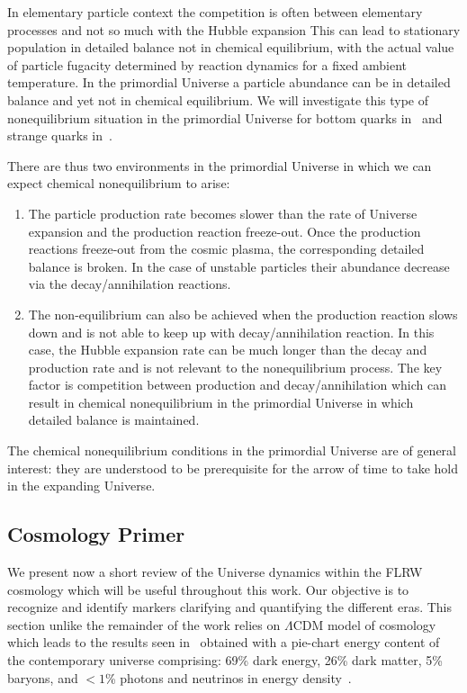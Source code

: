 In elementary particle context the competition is often between elementary processes and not so much with the Hubble expansion This can lead to stationary population in detailed balance not in chemical equilibrium, with  the actual value of particle fugacity determined by reaction dynamics for a fixed ambient temperature. In the primordial Universe a particle abundance can be in detailed balance and yet not in chemical equilibrium. We will investigate this type of nonequilibrium situation in the primordial Universe for bottom quarks in~ and strange quarks in~.

There are thus two environments in the primordial Universe in which we can expect chemical nonequilibrium to arise:
\begin{enumerate}
\item The particle production rate becomes slower than the rate of Universe expansion and the production reaction freeze-out. Once the production reactions freeze-out from the cosmic plasma, the corresponding detailed balance is broken. In the case of unstable particles their abundance decrease via the decay/annihilation reactions.
%
\item The non-equilibrium can also be achieved when the production reaction slows down and is not able to keep up with decay/annihilation reaction. In this case, the Hubble expansion rate can be much longer than the decay and production rate and is not relevant to the nonequilibrium process. The key factor is competition between production and decay/annihilation which can result in chemical nonequilibrium in the primordial Universe in which detailed balance is maintained.
\end{enumerate}
The chemical nonequilibrium conditions in the primordial Universe are of general interest: they are understood to be prerequisite for the arrow of time to take hold in the expanding Universe.


\subsection{Cosmology Primer}
\label{sec:flrw}
We present now a short review of the Universe dynamics within the FLRW cosmology which will be useful throughout this work. Our objective is to recognize and identify markers clarifying and quantifying the different eras. This section unlike the remainder of the work relies on  $\Lambda\mathrm{CDM}$ model of cosmology which leads to the results seen in~ obtained with a pie-chart energy content of the contemporary universe comprising: 69\% dark energy, 26\% dark matter, 5\% baryons, and $<1$\% photons and neutrinos in energy density~\cite{Davis:2003ad,Planck:2018vyg}. 

